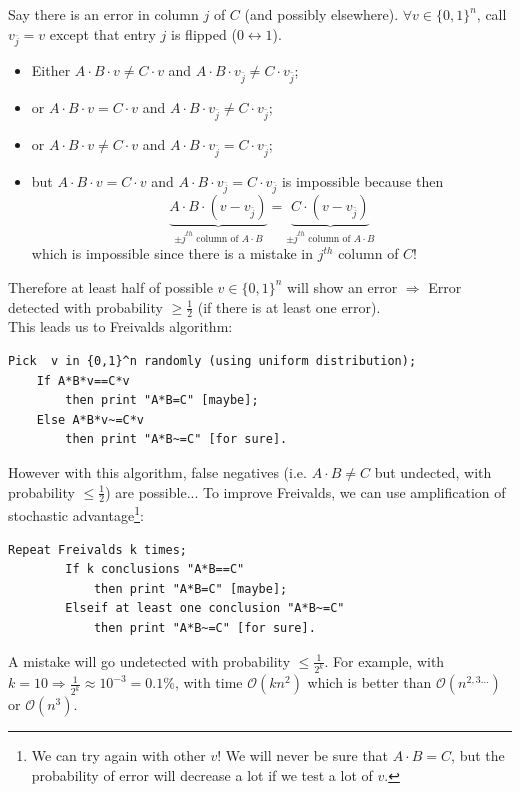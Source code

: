 	Say there is an error in column $j$ of $C$ (and possibly elsewhere). $\forall v\in \{0,1\}^n$, call $v_{\bar{j}}=v$ except that entry $j$ is flipped ($0 \leftrightarrow 1$). 
	\begin{itemize}
		\item Either $A\cdot B\cdot v\neq C\cdot v$ and $A\cdot B\cdot v_{\bar{j}}\neq C\cdot v_{\bar{j}}$;
		\item or $A\cdot B\cdot v= C\cdot v$ and $A\cdot B\cdot v_{\bar{j}}\neq C\cdot v_{\bar{j}}$;
		\item or $A\cdot B\cdot v\neq C\cdot v$ and $A\cdot B\cdot v_{\bar{j}}= C\cdot v_{\bar{j}}$;
		\item but $A\cdot B\cdot v= C\cdot v$ and $A\cdot B\cdot v_{\bar{j}}= C\cdot v_{\bar{j}}$ is impossible because then 
		$$\underbrace{A\cdot B \cdot (v-v_{\bar{j}})}_{\pm j^{th} \text{ column of } A\cdot B}=\underbrace{C\cdot (v-v_{\bar{j}})}_{\pm j^{th} \text{ column of } A\cdot B}$$
		which is impossible since there is a mistake in $j^{th}$ column of $C$!
	\end{itemize}
	Therefore at least half of possible $v\in \{0,1\}^n$ will show an error $\Rightarrow$ Error detected with probability $\geq \frac{1}{2}$ (if there is at least one error).\\
	
	This leads us to Freivalds algorithm:
	\begin{lstlisting}[caption={Freivalds Algorithm ($A$,$B$,$C$)}]
	Pick  v in {0,1}^n randomly (using uniform distribution);
	If A*B*v==C*v
		then print "A*B=C" [maybe];
	Else A*B*v~=C*v 
		then print "A*B~=C" [for sure].
	\end{lstlisting}
	
	However with this algorithm, false negatives (i.e. $A\cdot B\neq C$ but undected, with probability $\leq \frac{1}{2}$) are possible... To improve Freivalds, we can use amplification of stochastic advantage\footnote{We can try again with other $v$! We will never be sure that $A\cdot B=C$, but the probability of error will decrease a lot if we test a lot of $v$.}:
	\begin{lstlisting}[caption={Repeat($A$,$B$,$C$,$k$)}]
		Repeat Freivalds k times;
		If k conclusions "A*B==C" 
			then print "A*B=C" [maybe];
		Elseif at least one conclusion "A*B~=C" 
			then print "A*B~=C" [for sure].
	\end{lstlisting}
	A mistake will go undetected with probability $\leq \frac{1}{2^k}$. For example, with $k=10\Rightarrow \frac{1}{2^k}\approx 10^{-3}=0.1\%$, with time $\mathcal{O}(kn^{2})$ which is better than $\mathcal{O}(n^{2,3...})$ or $\mathcal{O}(n^{3})$.\\

